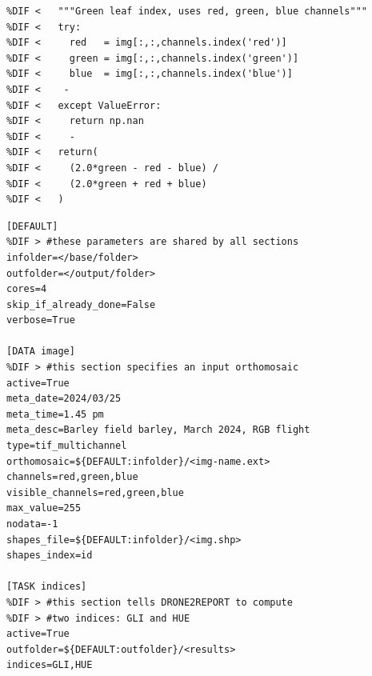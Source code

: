 \documentclass[drones,technicalnote,accept,pdftex,moreauthors]{Definitions/mdpi}
\providecommand{\DIFaddbegin}{} %
\providecommand{\DIFdelbegin}{} %
\providecommand{\DIFdelend}{} %
\providecommand{\DIFmodbegin}{} %
\providecommand{\DIFmodend}{} %
\newcommand{\DIFscaledelfig}{0.5}
\newlength{\DIFdelgraphicswidth} %
\newlength{\DIFdelgraphicsheight} %
\newcommand{\DIFaddincludegraphics}[2][]{{\color{blue}\fbox{\DIFOincludegraphics[#1]{#2}}}} %
\newcommand{\DIFdelincludegraphics}[2][]{%
\sbox{\DIFdelgraphicsbox}{\DIFOincludegraphics[#1]{#2}}%
\settoboxwidth{\DIFdelgraphicswidth}{\DIFdelgraphicsbox} %
\settoboxtotalheight{\DIFdelgraphicsheight}{\DIFdelgraphicsbox} %
\scalebox{\DIFscaledelfig}{%
\parbox[b]{\DIFdelgraphicswidth}{\usebox{\DIFdelgraphicsbox}\\[-\baselineskip] \rule{\DIFdelgraphicswidth}{0em}}\llap{\resizebox{\DIFdelgraphicswidth}{\DIFdelgraphicsheight}{%
\setlength{\unitlength}{\DIFdelgraphicswidth}%
\begin{picture}(1,1)%
\thicklines\linethickness{2pt} %
{\color[rgb]{1,0,0}\put(0,0){\framebox(1,1){}}}%
{\color[rgb]{1,0,0}\put(0,0){\line( 1,1){1}}}%
{\color[rgb]{1,0,0}\put(0,1){\line(1,-1){1}}}%
\end{picture}%
}\hspace*{3pt}}} %
} %
\DeclareRobustCommand{\DIFaddbegin}{\DIFOaddbegin \let\includegraphics\DIFaddincludegraphics} %
\DeclareRobustCommand{\DIFdelbegin}{\DIFOdelbegin \let\includegraphics\DIFdelincludegraphics} %
\DeclareRobustCommand{\DIFdelend}{\DIFOaddend \let\includegraphics\DIFOincludegraphics} %
\begin{document}
\begin{minipage}{\hsize}%
\DIFdelbegin %

\DIFmodbegin
\begin{lstlisting}[caption={Example of function computing the GLI vegetation index on a passed image},label={lst:GLI_function},alsolanguage=DIFcode]
%DIF < def GLI(img, channels):
%DIF <   """Green leaf index, uses red, green, blue channels"""
%DIF <   try:
%DIF <     red   = img[:,:,channels.index('red')]
%DIF <     green = img[:,:,channels.index('green')]
%DIF <     blue  = img[:,:,channels.index('blue')]
%DIF <    -
%DIF <   except ValueError:
%DIF <     return np.nan
%DIF <     -
%DIF <   return(
%DIF <     (2.0*green - red - blue) / 
%DIF <     (2.0*green + red + blue)
%DIF <   ) 
\end{lstlisting}
\DIFmodend %

\DIFdelend \lstset{frame=single,framexleftmargin=-1pt,framexrightmargin=-17pt,framesep=12pt,linewidth=0.98\textwidth,language=bash}%
\DIFdelbegin %
\DIFdelend \DIFaddbegin \DIFmodbegin
\begin{lstlisting}[caption={Example of configuration file to run \textsc{drone2report}.
This takes the form of a standard .ini file, divided in sections (between
square brackets) and supporting comments (using the hash symbol}, label={lst:config},alsolanguage=DIFcode]
[DEFAULT]
%DIF > #these parameters are shared by all sections
infolder=</base/folder>
outfolder=</output/folder>
cores=4
skip_if_already_done=False
verbose=True

[DATA image]
%DIF > #this section specifies an input orthomosaic
active=True
meta_date=2024/03/25
meta_time=1.45 pm
meta_desc=Barley field barley, March 2024, RGB flight
type=tif_multichannel
orthomosaic=${DEFAULT:infolder}/<img-name.ext>
channels=red,green,blue
visible_channels=red,green,blue
max_value=255 
nodata=-1
shapes_file=${DEFAULT:infolder}/<img.shp>
shapes_index=id

[TASK indices]
%DIF > #this section tells DRONE2REPORT to compute 
%DIF > #two indices: GLI and HUE
active=True
outfolder=${DEFAULT:outfolder}/<results>
indices=GLI,HUE
\end{lstlisting}
\DIFmodend
\end{minipage}
\end{document}
